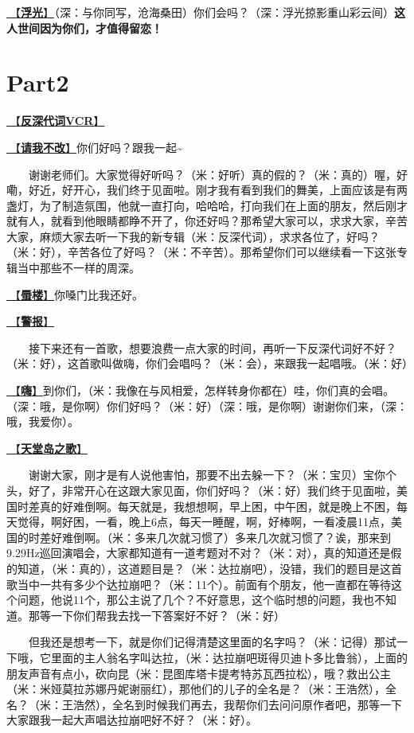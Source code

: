 \documentclass[]{ctexbook}
\begin{document}
\hyperref[floating-light]{🎵【\textbf{浮光}】}（深：与你同写，沧海桑田）你们会吗？（深：浮光掠影重山彩云间）\textbf{这人世间因为你们，才值得留恋！}

\section{Part2}\label{LasVegas-20250228-part2}

\hyperref[senself-vcr]{🎥【\textbf{反深代词VCR}】}

\hyperref[brave-heart]{🎵【\textbf{请我不改}】}你们好吗？跟我一起\textasciitilde{}

  谢谢老师们。大家觉得好听吗？（米：好听）真的假的？（米：真的）喔，好嘞，好近，好开心，我们终于见面啦。刚才我有看到我们的舞美，上面应该是有两盏灯，为了制造氛围，他就一直打向，哈哈哈，打向我们在上面的朋友，然后刚才就有人，就看到他眼睛都睁不开了，你还好吗？那希望大家可以，求求大家，辛苦大家，麻烦大家去听一下我的新专辑（米：反深代词），求求各位了，好吗？（米：好），辛苦各位了好吗？（米：不辛苦）。那希望你们可以继续看一下这张专辑当中那些不一样的周深。

\hyperref[mirage]{🎵【\textbf{蜃楼}】}你嗓门比我还好。

\hyperref[the-giver]{🎵【\textbf{警报}】}

  接下来还有一首歌，想要浪费一点大家的时间，再听一下反深代词好不好？（米：好），这首歌叫做嗨，你们会唱吗？（米：会），来跟我一起唱哦。（米：好）

\hyperref[say-hi]{🎵【\textbf{嗨}】}到你们，（米：我像在与风相爱，怎样转身你都在）哇，你们真的会唱。（深：哦，是你啊）你们好吗？（米：好）（深：哦，是你啊）谢谢你们来，（深：哦，我爱你）。

\hyperref[haven-song]{🎵【\textbf{天堂岛之歌}】}

  谢谢大家，刚才是有人说他害怕，那要不出去躲一下？（米：宝贝）宝你个头，好了，非常开心在这跟大家见面，你们好吗？（米：好）我们终于见面啦，美国时差真的好难倒啊。每天就是，我想想啊，早上困，中午困，就是晚上不困，每天觉得，啊好困，一看，晚上6点，每天一睡醒，啊，好棒啊，一看凌晨11点，美国的时差好难倒啊。（米：多来几次就习惯了）多来几次就习惯了？诶，那来到9.29Hz巡回演唱会，大家都知道有一道考题对不对？（米：对），真的知道还是假的知道，（米：真的），这道题目是？（米：达拉崩吧），没错，我们的题目是这首歌当中一共有多少个达拉崩吧？（米：11个）。前面有个朋友，他一直都在等待这个问题，他说11个，那公主说了几个？不好意思，这个临时想的问题，我也不知道。那等一下你们帮我去找一下答案好不好？（米：好）

  但我还是想考一下，就是你们记得清楚这里面的名字吗？（米：记得）那试一下哦，它里面的主人翁名字叫达拉，（米：达拉崩吧斑得贝迪卜多比鲁翁），上面的朋友声音有点小，砍向昆（米：昆图库塔卡提考特苏瓦西拉松），哦？救出公主（米：米娅莫拉苏娜丹妮谢丽红），那他们的儿子的全名是？（米：王浩然），全名？（米：王浩然），全名到时候我们再去，我帮你们去问问原作者吧，那等一下大家跟我一起大声唱达拉崩吧好不好？（米：好）。
\end{document}
